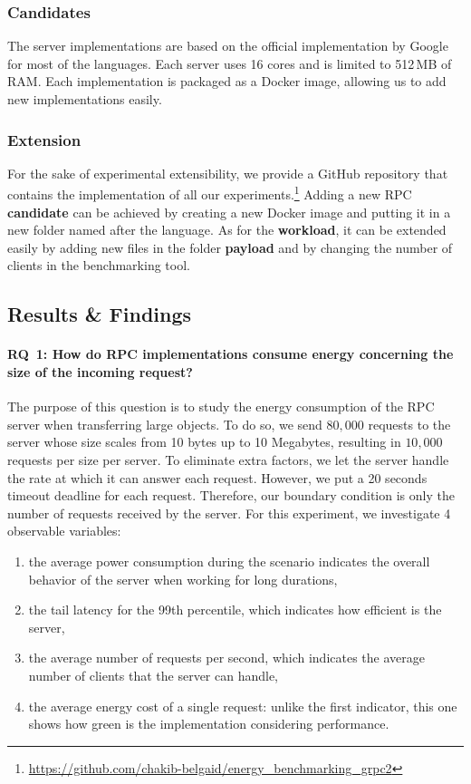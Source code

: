 \subsubsection*{Candidates}
The server implementations are based on the official implementation by Google for most of the languages.
Each server uses 16 cores and is limited to 512\,MB of RAM.
Each implementation is packaged as a Docker image, allowing us to add new implementations easily.

\subsubsection{Extension}
For the sake of experimental extensibility, we provide a GitHub repository that contains the implementation of all our experiments.\footnote{\url{https://github.com/chakib-belgaid/energy_benchmarking_grpc2}}
Adding a new RPC \textbf{candidate} can be achieved by creating a new Docker image and putting it in a new folder named after the language.
As for the \textbf{workload}, it can be extended easily by adding new files in the folder \textbf{payload} and by changing the number of clients in the benchmarking tool.


\subsection{Results \& Findings}
\paragraph{\textsc{RQ}~1: How do RPC implementations consume energy concerning the size of the incoming request?}

The purpose of this question is to study the energy consumption of the RPC server when transferring large objects.
To do so, we send $80,000$ requests to the server whose size scales from 10 bytes up to 10 Megabytes, resulting in $10,000$ requests per size per server.
To eliminate extra factors, we let the server handle the rate at which it can answer each request.
However, we put a 20 seconds timeout deadline for each request.
Therefore, our boundary condition is only the number of requests received by the server.
For this experiment, we investigate 4 observable variables:
\begin{enumerate}
    \item the \textsf{average power consumption} during the scenario indicates the overall behavior of the server when working for long durations,
    \item the \textsf{tail latency} for the 99th percentile, which indicates how efficient is the server,
    \item the \textsf{average number of requests per second}, which indicates the average number of clients that the server can handle,
    \item the \textsf{average energy cost} of a single request: unlike the first indicator, this one shows how green is the implementation considering performance.
\end{enumerate}


